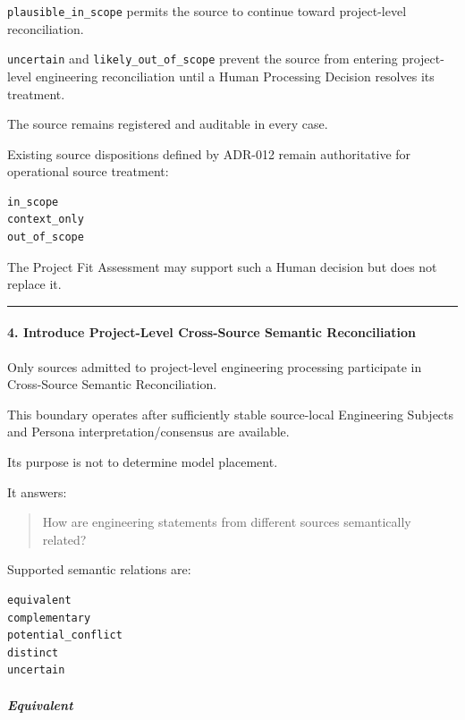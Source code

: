 \texttt{plausible\_in\_scope} permits the source to continue toward project-level reconciliation.

\texttt{uncertain} and \texttt{likely\_out\_of\_scope} prevent the source from entering project-level engineering reconciliation until a Human Processing Decision resolves its treatment.

The source remains registered and auditable in every case.

Existing source dispositions defined by ADR-012 remain authoritative for operational source treatment:

\begin{verbatim}
in_scope
context_only
out_of_scope
\end{verbatim}

The Project Fit Assessment may support such a Human decision but does not replace it.

\begin{center}\rule{0.5\linewidth}{0.5pt}\end{center}

\hypertarget{4-introduce-project-level-cross-source-semantic-reconciliation}{%
\paragraph{4. Introduce Project-Level Cross-Source Semantic Reconciliation}\label{4-introduce-project-level-cross-source-semantic-reconciliation}}

Only sources admitted to project-level engineering processing participate in Cross-Source Semantic Reconciliation.

This boundary operates after sufficiently stable source-local Engineering Subjects and Persona interpretation/consensus are available.

Its purpose is not to determine model placement.

It answers:

\begin{quote}
How are engineering statements from different sources semantically related?
\end{quote}

Supported semantic relations are:

\begin{verbatim}
equivalent
complementary
potential_conflict
distinct
uncertain
\end{verbatim}

\hypertarget{equivalent}{%
\subparagraph{Equivalent}\label{equivalent}}

